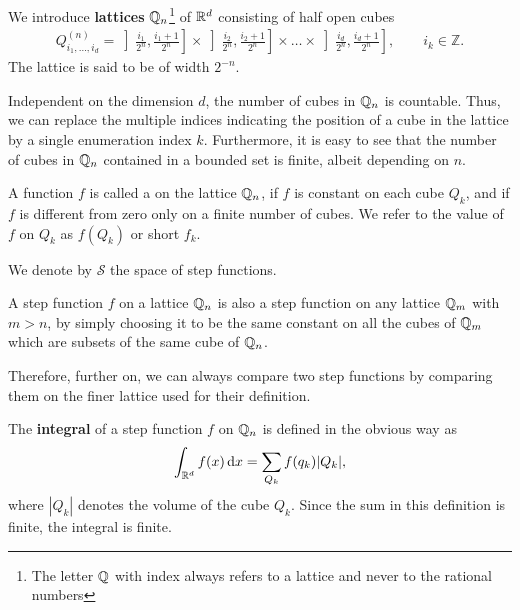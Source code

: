 \begin{definition}
   We introduce \textbf{lattices}
  $\mathbb Q_n$\footnote{The letter $\mathbb Q$ with index always refers to a
    lattice and never to the rational numbers} of $\mathbb R^d$ consisting of
  half open cubes
  \begin{gather*}
    Q^{(n)}_{i_1,\dots,i_d} =
    \left]\tfrac{i_1}{2^n},\tfrac{i_1+1}{2^n}\right]
    \times
    \left]\tfrac{i_2}{2^n},\tfrac{i_2+1}{2^n}\right]
    \times\dots\times
    \left]\tfrac{i_d}{2^n},\tfrac{i_d+1}{2^n}\right],
    \qquad i_k\in\mathbb Z.
  \end{gather*}
  The lattice is said to be of width $2^{-n}$.
\end{definition}

\begin{note}
  Independent on the dimension $d$, the number of cubes in $\mathbb Q_n$ is
  countable. Thus, we can replace the multiple indices indicating the
  position of a cube in the lattice by a single enumeration index
  $k$. Furthermore, it is easy to see that the number of cubes in
  $\mathbb Q_n$ contained in a bounded set is finite, albeit depending on $n$.
\end{note}

\begin{definition}
  A function $f$ is called a  on the lattice
  $\mathbb Q_n$, if $f$ is constant on each cube $Q_k$, and if $f$ is
  different from zero only on a finite number of cubes.  We refer to
  the value of $f$ on $Q_k$ as $f(Q_k)$ or short $f_k$.
  
  We denote by $\mathcal S$ the space of step functions.
\end{definition}

\begin{note}
  A step function $f$ on a lattice $\mathbb Q_n$ is also a step function on
  any lattice $\mathbb Q_m$ with $m>n$, by simply choosing it to be the same
  constant on all the cubes of $\mathbb Q_m$ which are subsets of the same
  cube of $\mathbb Q_n$.
  
  Therefore, further on, we can always compare two step functions by
  comparing them on the finer lattice used for their definition.
\end{note}


\begin{definition}
  The \textbf{integral} of a step function $f$ on $\mathbb Q_n$ is
  defined in the obvious way as
  \begin{gather*}
    \int_{\mathbb R^d} f(x) \,\mathrm{d} x = \sum_{Q_k} f(q_k) |Q_k|,
  \end{gather*}
  where $|Q_k|$ denotes the volume of the cube $Q_k$. Since the sum in
  this definition is finite, the integral is finite.
\end{definition}

